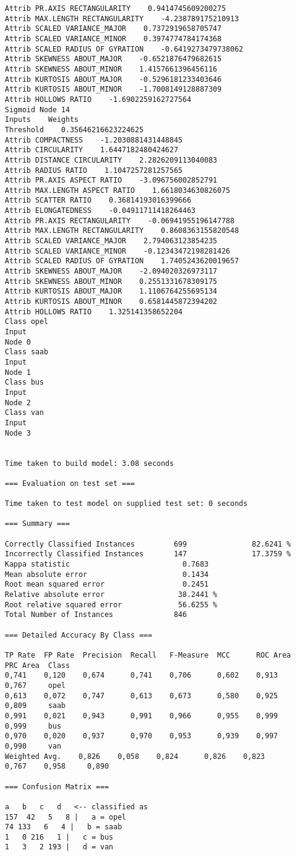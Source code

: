 \documentclass[
	article,			%
	11pt,				%
	oneside,			%
	a4paper,			%
	english,			%
	brazil,				%
	sumario=tradicional
	]{abntex2}
\begin{document}
\begin{lstlisting}
Attrib PR.AXIS RECTANGULARITY    0.9414745609200275
Attrib MAX.LENGTH RECTANGULARITY    -4.238789175210913
Attrib SCALED VARIANCE_MAJOR    0.7372919658705747
Attrib SCALED VARIANCE_MINOR    0.3974774784174368
Attrib SCALED RADIUS OF GYRATION    -0.6419273479738062
Attrib SKEWNESS ABOUT_MAJOR    -0.6521876479682615
Attrib SKEWNESS ABOUT_MINOR    1.4157661396456116
Attrib KURTOSIS ABOUT_MAJOR    -0.5296181233403646
Attrib KURTOSIS ABOUT_MINOR    -1.7008149128887309
Attrib HOLLOWS RATIO    -1.6902259162727564
Sigmoid Node 14
Inputs    Weights
Threshold    0.35646216623224625
Attrib COMPACTNESS    -1.2030881431448845
Attrib CIRCULARITY    1.6447182480424627
Attrib DISTANCE CIRCULARITY    2.2826209113040083
Attrib RADIUS RATIO    1.1047257281257565
Attrib PR.AXIS ASPECT RATIO    -3.096756002852791
Attrib MAX.LENGTH ASPECT RATIO    1.6618034630826075
Attrib SCATTER RATIO    0.36814193016399666
Attrib ELONGATEDNESS    -0.04911711418264463
Attrib PR.AXIS RECTANGULARITY    -0.06941955196147788
Attrib MAX.LENGTH RECTANGULARITY    0.8608363155820548
Attrib SCALED VARIANCE_MAJOR    2.794063123854235
Attrib SCALED VARIANCE_MINOR    -0.12343472198281426
Attrib SCALED RADIUS OF GYRATION    1.7405243620019657
Attrib SKEWNESS ABOUT_MAJOR    -2.094020326973117
Attrib SKEWNESS ABOUT_MINOR    0.2551331678309175
Attrib KURTOSIS ABOUT_MAJOR    1.1106764255695134
Attrib KURTOSIS ABOUT_MINOR    0.6581445872394202
Attrib HOLLOWS RATIO    1.325141358652204
Class opel
Input
Node 0
Class saab
Input
Node 1
Class bus
Input
Node 2
Class van
Input
Node 3


Time taken to build model: 3.08 seconds

=== Evaluation on test set ===

Time taken to test model on supplied test set: 0 seconds

=== Summary ===

Correctly Classified Instances         699               82.6241 %
Incorrectly Classified Instances       147               17.3759 %
Kappa statistic                          0.7683
Mean absolute error                      0.1434
Root mean squared error                  0.2451
Relative absolute error                 38.2441 %
Root relative squared error             56.6255 %
Total Number of Instances              846     

=== Detailed Accuracy By Class ===

TP Rate  FP Rate  Precision  Recall   F-Measure  MCC      ROC Area  PRC Area  Class
0,741    0,120    0,674      0,741    0,706      0,602    0,913     0,767     opel
0,613    0,072    0,747      0,613    0,673      0,580    0,925     0,809     saab
0,991    0,021    0,943      0,991    0,966      0,955    0,999     0,999     bus
0,970    0,020    0,937      0,970    0,953      0,939    0,997     0,990     van
Weighted Avg.    0,826    0,058    0,824      0,826    0,823      0,767    0,958     0,890     

=== Confusion Matrix ===

a   b   c   d   <-- classified as
157  42   5   8 |   a = opel
74 133   6   4 |   b = saab
1   0 216   1 |   c = bus
1   3   2 193 |   d = van
	
	
\end{lstlisting}
\end{document}
